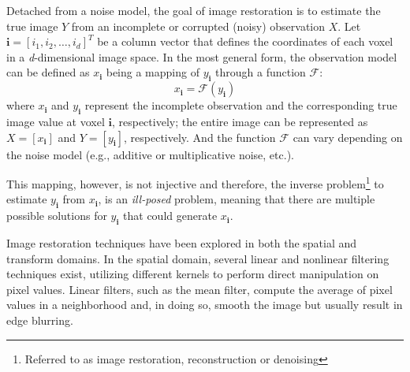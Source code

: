 Detached from a noise model, the goal of image restoration is to estimate the true image $Y$  from an incomplete or corrupted (noisy) observation $X$. Let $\mathbf{i} = [i_1, i_2, \dots, i_d]^T$ be a column vector that defines the coordinates of each voxel in a \textit{d}-dimensional image space. In the most general form, the observation model can be defined as $x_{\mathbf{i}}$ being a mapping of $y_{\mathbf{i}}$ through a function $\mathcal{F}$:
\begin{equation}\label{eq:observation-model}
    x_{\mathbf{i}} = \mathcal{F} (y_{\mathbf{i}})
\end{equation}
where $x_{\mathbf{i}}$ and $y_{\mathbf{i}}$ represent the incomplete observation and the corresponding true image value at voxel $\mathbf{i}$, respectively; the entire image can be represented as $X = [x_{\mathbf{i}}]$  and $Y = [y_{\mathbf{i}}]$, respectively. And the function $\mathcal{F}$ can vary depending on the noise model (e.g., additive or multiplicative noise, etc.).

This mapping, however, is not injective and therefore, the inverse problem\footnote{Referred to as image restoration, reconstruction or denoising} to estimate $y_{\mathbf{i}}$ from $x_{\mathbf{i}}$, is an \textit{ill-posed} problem, meaning that there are multiple possible solutions for $y_{\mathbf{i}}$ that could generate $x_{\mathbf{i}}$.

Image restoration techniques have been explored in both the spatial and transform domains. In the spatial domain, several linear and nonlinear filtering techniques exist, utilizing different kernels to perform direct manipulation on pixel values. Linear filters, such as the mean filter, compute the average of pixel values in a neighborhood and, in doing so, smooth the image but usually result in edge blurring.

